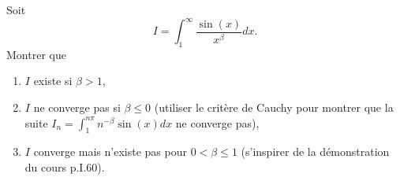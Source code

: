 

\begin{exercice}\label{exo_I-2-2}

Soit
\begin{equation}
	I=\int_1^{\infty}\frac{ \sin(x) }{ x^{\beta} }dx.
\end{equation}
Montrer que
\begin{enumerate}
\item $I$ existe si $\beta>1$,
\item $I$ ne converge pas si $\beta\leq 0$ (utiliser le critère de Cauchy pour montrer que la suite $I_n=\int_1^{n\pi}n^{-\beta}\sin(x)dx$ ne converge pas),
\item $I$ converge mais n'existe pas pour $0<\beta\leq 1$ (s'inspirer de la démonstration du cours p.I.60).
\end{enumerate}

\end{exercice}
